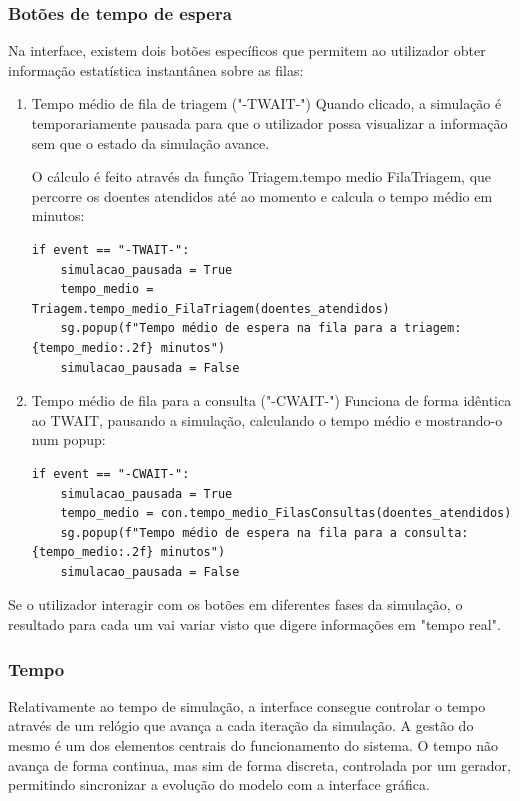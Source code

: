 \documentclass[12pt,a4paper]{article} %
\begin{document}
\subsubsection{Botões de tempo de espera}
Na interface, existem dois botões específicos que permitem ao utilizador obter informação estatística instantânea sobre as filas:
\begin{enumerate}
    \item Tempo médio de fila de triagem ("-TWAIT-")
    Quando clicado, a simulação é temporariamente pausada para que o utilizador possa visualizar a informação sem que o estado da simulação avance.

    O cálculo é feito através da função Triagem.tempo medio FilaTriagem, que percorre os doentes atendidos até ao momento e calcula o tempo médio em minutos:
\begin{verbatim}
if event == "-TWAIT-":
    simulacao_pausada = True
    tempo_medio = Triagem.tempo_medio_FilaTriagem(doentes_atendidos)
    sg.popup(f"Tempo médio de espera na fila para a triagem: {tempo_medio:.2f} minutos")
    simulacao_pausada = False
\end{verbatim}

    \item Tempo médio de fila para a consulta ("-CWAIT-")
    Funciona de forma idêntica ao TWAIT, pausando a simulação, calculando o tempo médio e mostrando-o num popup:
\begin{verbatim}
if event == "-CWAIT-":
    simulacao_pausada = True
    tempo_medio = con.tempo_medio_FilasConsultas(doentes_atendidos)
    sg.popup(f"Tempo médio de espera na fila para a consulta: {tempo_medio:.2f} minutos")
    simulacao_pausada = False
\end{verbatim}
\end{enumerate}
\medskip
Se o utilizador interagir com os botões em diferentes fases da simulação, o resultado para cada um vai variar visto que digere informações em "tempo real".


\subsubsection{Tempo}

    Relativamente ao tempo de simulação, a interface consegue controlar o tempo através de um relógio que avança a cada iteração da simulação. A gestão do mesmo é um dos elementos centrais do funcionamento do sistema. O tempo não avança de forma continua, mas sim de forma discreta, controlada por um gerador, permitindo sincronizar a evolução do modelo com a interface gráfica.
\end{document}
